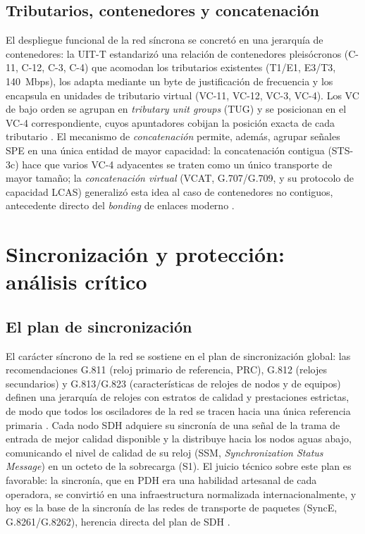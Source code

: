 \documentclass[12pt,a4paper]{article}
\begin{document}
\subsection{Tributarios, contenedores y concatenación}

El despliegue funcional de la red síncrona se concretó en una jerarquía de contenedores: la UIT-T estandarizó una relación de contenedores pleisócronos (C-11, C-12, C-3, C-4) que acomodan los tributarios existentes (T1/E1, E3/T3, 140~Mbps), los adapta mediante un byte de justificación de frecuencia y los encapsula en unidades de tributario virtual (VC-11, VC-12, VC-3, VC-4). Los VC de bajo orden se agrupan en \emph{tributary unit groups} (TUG) y se posicionan en el VC-4 correspondiente, cuyos apuntadores cobijan la posición exacta de cada tributario \cite{itug707, stallings2004}. El mecanismo de \emph{concatenación} permite, además, agrupar señales SPE en una única entidad de mayor capacidad: la concatenación contigua (STS-3c) hace que varios VC-4 adyacentes se traten como un único transporte de mayor tamaño; la \emph{concatenación virtual} (VCAT, G.707/G.709, y su protocolo de capacidad LCAS) generalizó esta idea al caso de contenedores no contiguos, antecedente directo del \emph{bonding} de enlaces moderno \cite{itug707, ituG709}.

\section{Sincronización y protección: análisis crítico}

\subsection{El plan de sincronización}

El carácter síncrono de la red se sostiene en el plan de sincronización global: las recomendaciones G.811 (reloj primario de referencia, PRC), G.812 (relojes secundarios) y G.813/G.823 (características de relojes de nodos y de equipos) definen una jerarquía de relojes con estratos de calidad y prestaciones estrictas, de modo que todos los osciladores de la red se tracen hacia una única referencia primaria \cite{ituG811, ituG823}. Cada nodo SDH adquiere su sincronía de una señal de la trama de entrada de mejor calidad disponible y la distribuye hacia los nodos aguas abajo, comunicando el nivel de calidad de su reloj (SSM, \emph{Synchronization Status Message}) en un octeto de la sobrecarga (S1). El juicio técnico sobre este plan es favorable: la sincronía, que en PDH era una habilidad artesanal de cada operadora, se convirtió en una infraestructura normalizada internacionalmente, y hoy es la base de la sincronía de las redes de transporte de paquetes (SyncE, G.8261/G.8262), herencia directa del plan de SDH \cite{ituG8261}.
\end{document}
